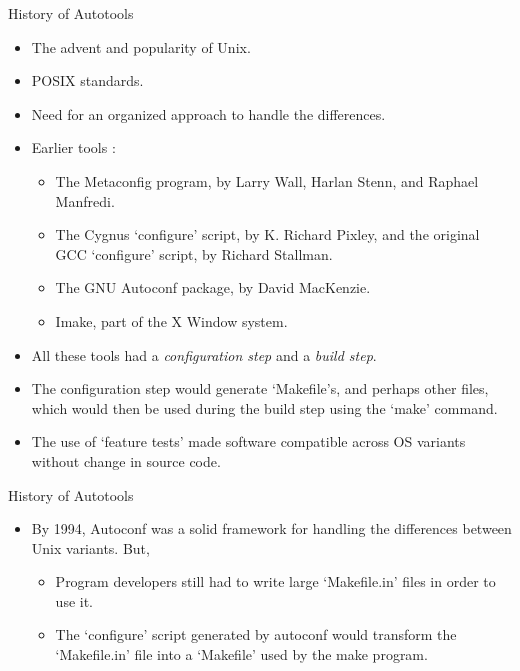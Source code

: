 \documentclass{beamer}
\begin{document}
\begin{frame}{History of Autotools}
\begin{itemize}
	\item The advent and popularity of Unix. \pause
	\item POSIX standards. \pause
	\item Need for an organized approach to handle the differences.\pause
	\item Earlier tools :\pause
	\begin{itemize}
		\item The Metaconfig program, by Larry Wall, Harlan Stenn, and Raphael Manfredi.
    	\item The Cygnus `configure' script, by K. Richard Pixley, and the original GCC `configure' script, by Richard Stallman.
		\item The GNU Autoconf package, by David MacKenzie.
		\item Imake, part of the X Window system. 
	\end{itemize}\pause
	\item All these tools had a \emph{configuration step} and a \emph{build step}.\pause
	\item The configuration step would generate `Makefile's, and perhaps other files, which would then be used during the build step using the `make' command. \pause
	\item The use of `feature tests' made software compatible across OS variants without change in source code.
\end{itemize}
\end{frame}

\begin{frame}{History of Autotools}
\begin{itemize}
	\item By 1994, Autoconf was a solid framework for handling the differences between Unix variants. But, \pause
	\begin{itemize}
		\item Program developers still had to write large `Makefile.in' files in order to use it.\pause
		\item The `configure' script generated by autoconf would transform the `Makefile.in' file into a `Makefile' used by the make program. \pause
	\end{itemize}	
\end{itemize}
\end{frame}
\end{document}
